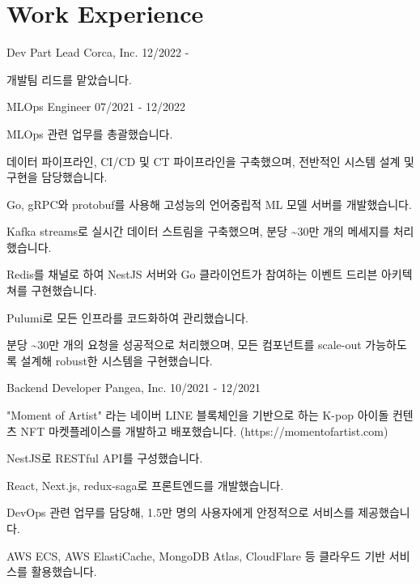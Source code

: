 \section{Work Experience}

\cventry
{Dev Part Lead} %
{Corca, Inc.} %
{} %
{12/2022 -} %
\begin{cvitems}
\item {개발팀 리드를 맡았습니다.}
\end{cvitems}

\cventry
{MLOps Engineer} %
{} %
{} %
{07/2021 - 12/2022} %
\begin{cvitems}
\item {MLOps 관련 업무를 총괄했습니다.}
\item {데이터 파이프라인, CI/CD 및 CT 파이프라인을 구축했으며, 전반적인 시스템 설계 및 구현을 담당했습니다.}
\item {Go, gRPC와 protobuf를 사용해 고성능의 언어중립적 ML 모델 서버를 개발했습니다.}
\item {Kafka streams로 실시간 데이터 스트림을 구축했으며, 분당 \textasciitilde 30만 개의 메세지를 처리했습니다.}
\item {Redis를 채널로 하여 NestJS 서버와 Go 클라이언트가 참여하는 이벤트 드리븐 아키텍쳐를 구현했습니다.}
\item {Pulumi로 모든 인프라를 코드화하여 관리했습니다.}
\item {분당 \textasciitilde 30만 개의 요청을 성공적으로 처리했으며, 모든 컴포넌트를 scale-out 가능하도록 설계해 robust한 시스템을 구현했습니다.}
\end{cvitems}

\cventry
{Backend Developer} %
{Pangea, Inc.} %
{} %
{10/2021 - 12/2021} %
\begin{cvitems}
\item {"Moment of Artist" 라는 네이버 LINE 블록체인을 기반으로 하는 K-pop 아이돌 컨텐츠 NFT 마켓플레이스를 개발하고 배포했습니다. (https://momentofartist.com)}
\item {NestJS로 RESTful API를 구성했습니다.}
\item {React, Next.js, redux-saga로 프론트엔드를 개발했습니다.}
\item {DevOps 관련 업무를 담당해, 1.5만 명의 사용자에게 안정적으로 서비스를 제공했습니다.}
\item {AWS ECS, AWS ElastiCache, MongoDB Atlas, CloudFlare 등 클라우드 기반 서비스를 활용했습니다.}
\end{cvitems}

